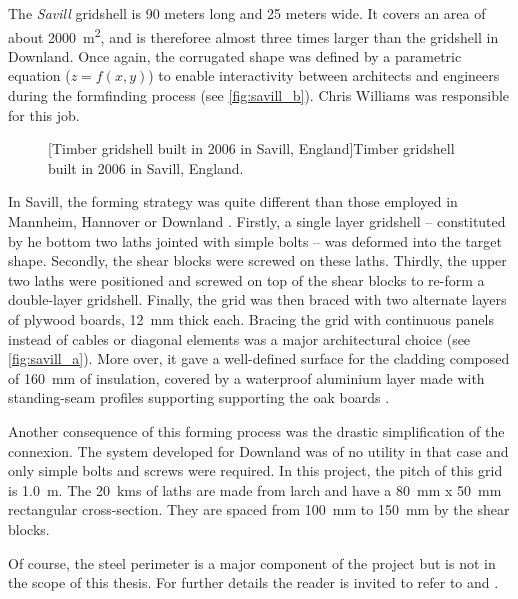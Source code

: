 The \emph{Savill} gridshell is 90 meters long and 25 meters wide. It covers an area of about \SI{2000}{m^2}, and is thereforee almost three times larger than the gridshell in Downland. Once again, the corrugated shape was defined by a parametric equation ($z = f(x,y)$) to enable interactivity between architects and engineers during the formfinding process (see \cref{fig:savill_b}). Chris Williams was responsible for this job.
 \begin{figure}[h]
		\hspace*{\fill}
		\vspace{10pt}
		[Timber gridshell built in 2006 in Savill, England]{Timber gridshell built in 2006 in Savill, England.}
		\label{fig:savill} 
\end{figure}

In Savill, the forming strategy was quite different than those employed in Mannheim, Hannover or Downland \cite{Harris2008}. Firstly, a single layer gridshell -- constituted by he bottom two laths jointed with simple bolts -- was deformed into the target shape. Secondly, the shear blocks were screwed on these laths. Thirdly, the upper two laths were positioned and screwed on top of the shear blocks to re-form a double-layer gridshell. Finally, the grid was then braced with two alternate layers of plywood boards, \SI{12}{mm} thick each. Bracing the grid with continuous panels instead of cables or diagonal elements was a major architectural choice (see \cref{fig:savill_a}). More over, it gave a well-defined surface for the cladding composed of \SI{160}{mm} of insulation, covered by a waterproof aluminium layer made with standing-seam profiles supporting supporting the oak boards \cite{Trada2006}.

Another consequence of this forming process was the drastic simplification of the connexion. The system developed for Downland was of no utility in that case and only simple bolts and screws were required. In this project, the pitch of this grid is \SI{1.0}{m}. The \SI{20}{kms} of laths are made from larch and have a \SI{80}{mm} x \SI{50}{mm} rectangular cross-section. They are spaced from \SI{100}{mm} to \SI{150}{mm} by the shear blocks.

Of course, the steel perimeter is a major component of the project but is not in the scope of this thesis. For further details the reader is invited to refer to \citet{Harris2008} and \citet{Trada2006}. 


